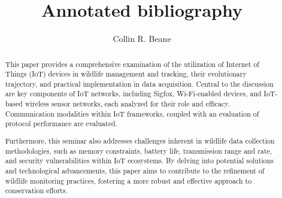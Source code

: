 \documentclass[sigplan,screen,nonacm]{acmart}
\begin{document}
\title{Annotated bibliography}

\author{Collin R. Beane}

\begin{abstract}
	This paper provides a comprehensive examination of the utilization of Internet of Things (IoT) devices in wildlife management and tracking, their evolutionary trajectory, and practical implementation in data acquisition. Central to the discussion are key components of IoT networks, including Sigfox, Wi-Fi-enabled devices, and IoT-based wireless sensor networks, each analyzed for their role and efficacy. Communication modalities within IoT frameworks, coupled with an evaluation of protocol performance are evaluated.

    Furthermore, this seminar also addresses challenges inherent in wildlife data collection methodologies, such as memory constraints, battery life, transmission range and rate, and security vulnerabilities within IoT ecosystems. By delving into potential solutions and technological advancements, this paper aims to contribute to the refinement of wildlife monitoring practices, fostering a more robust and effective approach to conservation efforts.
\end{abstract}




\maketitle
\end{document}
